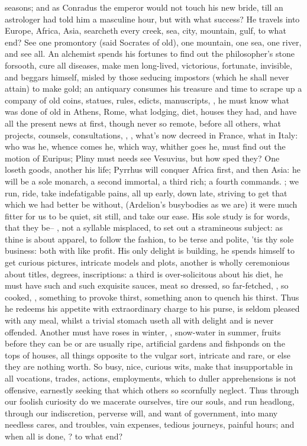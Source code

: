 seasons; and as Conradus the emperor would not touch his
new bride, till an astrologer had told him a masculine hour, but with what
success? He travels into Europe, Africa, Asia, searcheth every creek, sea,
city, mountain, gulf, to what end? See one promontory (said Socrates of old),
one mountain, one sea, one river, and see all. An alchemist spends his fortunes
to find out the philosopher's stone forsooth, cure all diseases, make men
long-lived, victorious, fortunate, invisible, and beggars himself, misled by
those seducing impostors (which he shall never attain) to make gold; an
antiquary consumes his treasure and time to scrape up a company of old coins,
statues, rules, edicts, manuscripts, \etc{}, he must know what was done of old
in Athens, Rome, what lodging, diet, houses they had, and have all the present
news at first, though never so remote, before all others, what projects,
counsels, consultations, \etc{}, ,
what's now decreed in France, what in Italy: who was he, whence comes he, which
way, whither goes he, \etc{} \Aristotle{} must find out the motion of Euripus;
Pliny must needs see Vesuvius, but how sped they? One loseth goods, another his
life; Pyrrhus will conquer Africa first, and then Asia: he will be a sole
monarch, a second immortal, a third rich; a fourth commands.
; we
run, ride, take indefatigable pains, all up early, down late, striving to get
that which we had better be without, (Ardelion's busybodies as we are) it were
much fitter for us to be quiet, sit still, and take our ease. His sole study is
for words, that they be-- ,
not a syllable misplaced, to set out a stramineous subject: as thine is about
apparel, to follow the fashion, to be terse and polite, 'tis thy sole business:
both with like profit. His only delight is building, he spends himself to get
curious pictures, intricate models and plots, another is wholly ceremonious
about titles, degrees, inscriptions: a third is over-solicitous about his diet,
he must have such and such exquisite sauces, meat so dressed, so far-fetched,
, so cooked, \etc{}, something to provoke thirst,
something anon to quench his thirst. Thus he redeems his appetite with
extraordinary charge to his purse, is seldom pleased with any meal, whilst a
trivial stomach useth all with delight and is never offended. Another must have
roses in winter, , snow-water in summer, fruits
before they can be or are usually ripe, artificial gardens and fishponds on the
tops of houses, all things opposite to the vulgar sort, intricate and rare, or
else they are nothing worth. So busy, nice, curious wits, make that
insupportable in all vocations, trades, actions, employments, which to duller
apprehensions is not offensive, earnestly seeking that which others so
scornfully neglect. Thus through our foolish curiosity do we macerate
ourselves, tire our souls, and run headlong, through our indiscretion, perverse
will, and want of government, into many needless cares, and troubles, vain
expenses, tedious journeys, painful hours; and when all is done, ? to what end?

